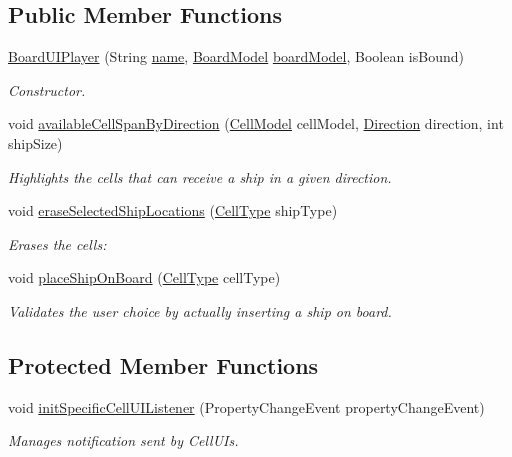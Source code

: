 \subsection*{Public Member Functions}
\begin{DoxyCompactItemize}
\item 
\hyperlink{classbattleship2D_1_1ui_1_1BoardUIPlayer_aaa8a0ba6dc59dcb628e89c0bf5432b3a}{Board\-U\-I\-Player} (String \hyperlink{classbattleship2D_1_1ui_1_1BoardUI_a7ad8f5d72803137c6ea6bde92a667c03}{name}, \hyperlink{classbattleship2D_1_1model_1_1BoardModel}{Board\-Model} \hyperlink{classbattleship2D_1_1ui_1_1BoardUI_a6c61b16484c780fb58e68bc8fb1494e6}{board\-Model}, Boolean is\-Bound)
\begin{DoxyCompactList}\small\item\em Constructor. \end{DoxyCompactList}\item 
void \hyperlink{classbattleship2D_1_1ui_1_1BoardUIPlayer_ab9e219c9243c91a4461cd1f6ce46066c}{available\-Cell\-Span\-By\-Direction} (\hyperlink{classbattleship2D_1_1model_1_1CellModel}{Cell\-Model} cell\-Model, \hyperlink{enumbattleship2D_1_1model_1_1Direction}{Direction} direction, int ship\-Size)
\begin{DoxyCompactList}\small\item\em Highlights the cells that can receive a ship in a given direction. \end{DoxyCompactList}\item 
void \hyperlink{classbattleship2D_1_1ui_1_1BoardUIPlayer_a12066af880f31bac98afa295ab9fafc4}{erase\-Selected\-Ship\-Locations} (\hyperlink{enumbattleship2D_1_1model_1_1CellType}{Cell\-Type} ship\-Type)
\begin{DoxyCompactList}\small\item\em Erases the cells\-: \end{DoxyCompactList}\item 
void \hyperlink{classbattleship2D_1_1ui_1_1BoardUIPlayer_a9229c03cfad2d3af9aa7fdaa9f9d3d2a}{place\-Ship\-On\-Board} (\hyperlink{enumbattleship2D_1_1model_1_1CellType}{Cell\-Type} cell\-Type)
\begin{DoxyCompactList}\small\item\em Validates the user choice by actually inserting a ship on board. \end{DoxyCompactList}\end{DoxyCompactItemize}
\subsection*{Protected Member Functions}
\begin{DoxyCompactItemize}
\item 
void \hyperlink{classbattleship2D_1_1ui_1_1BoardUIPlayer_a2c7f4d5fdde5b8753c183115a791776a}{init\-Specific\-Cell\-U\-I\-Listener} (Property\-Change\-Event property\-Change\-Event)
\begin{DoxyCompactList}\small\item\em Manages notification sent by Cell\-U\-Is. \end{DoxyCompactList}\end{DoxyCompactItemize}
